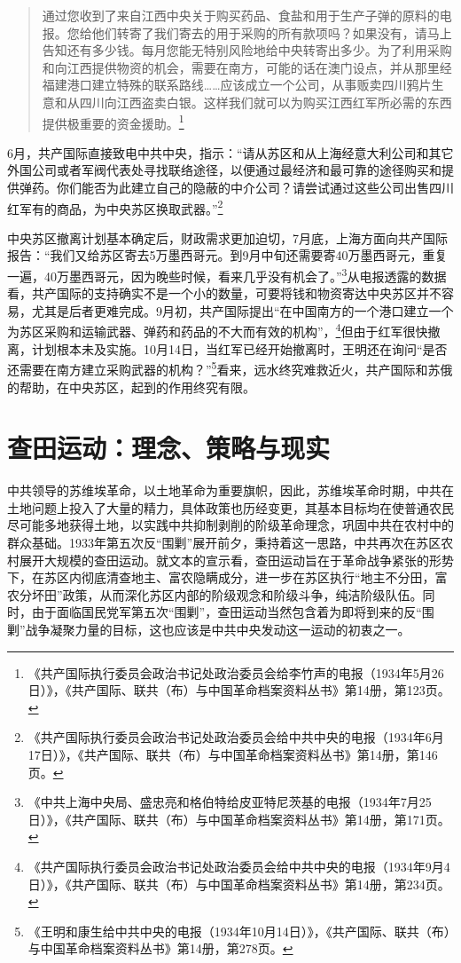 \begin{quote}

通过您收到了来自江西中央关于购买药品、食盐和用于生产子弹的原料的电报。您给他们转寄了我们寄去的用于采购的所有款项吗？如果没有，请马上告知还有多少钱。每月您能无特别风险地给中央转寄出多少。为了利用采购和向江西提供物资的机会，需要在南方，可能的话在澳门设点，并从那里经福建港口建立特殊的联系路线……应该成立一个公司，从事贩卖四川鸦片生意和从四川向江西盗卖白银。这样我们就可以为购买江西红军所必需的东西提供极重要的资金援助。\footnote{《共产国际执行委员会政治书记处政治委员会给李竹声的电报（1934年5月26日）》，《共产国际、联共（布）与中国革命档案资料丛书》第14册，第123页。}
\end{quote}


6月，共产国际直接致电中共中央，指示：“请从苏区和从上海经意大利公司和其它外国公司或者军阀代表处寻找联络途径，以便通过最经济和最可靠的途径购买和提供弹药。你们能否为此建立自己的隐蔽的中介公司？请尝试通过这些公司出售四川红军有的商品，为中央苏区换取武器。”\footnote{《共产国际执行委员会政治书记处政治委员会给中共中央的电报（1934年6月17日）》，《共产国际、联共（布）与中国革命档案资料丛书》第14册，第146页。}


中央苏区撤离计划基本确定后，财政需求更加迫切，7月底，上海方面向共产国际报告：“我们又给苏区寄去5万墨西哥元。到9月中旬还需要寄40万墨西哥元，重复一遍，40万墨西哥元，因为晚些时候，看来几乎没有机会了。”\footnote{《中共上海中央局、盛忠亮和格伯特给皮亚特尼茨基的电报（1934年7月25日）》，《共产国际、联共（布）与中国革命档案资料丛书》第14册，第171页。}从电报透露的数据看，共产国际的支持确实不是一个小的数量，可要将钱和物资寄达中央苏区并不容易，尤其是后者更难完成。9月初，共产国际提出“在中国南方的一个港口建立一个为苏区采购和运输武器、弹药和药品的不大而有效的机构”，\footnote{《共产国际执行委员会政治书记处政治委员会给中共中央的电报（1934年9月4日）》，《共产国际、联共（布）与中国革命档案资料丛书》第14册，第234页。}但由于红军很快撤离，计划根本未及实施。10月14日，当红军已经开始撤离时，王明还在询问“是否还需要在南方建立采购武器的机构？”\footnote{《王明和康生给中共中央的电报（1934年10月14日）》，《共产国际、联共（布）与中国革命档案资料丛书》第14册，第278页。}看来，远水终究难救近火，共产国际和苏俄的帮助，在中央苏区，起到的作用终究有限。

\section{查田运动：理念、策略与现实}


中共领导的苏维埃革命，以土地革命为重要旗帜，因此，苏维埃革命时期，中共在土地问题上投入了大量的精力，具体政策也历经变更，其基本目标均在使普通农民尽可能多地获得土地，以实践中共抑制剥削的阶级革命理念，巩固中共在农村中的群众基础。1933年第五次反“围剿”展开前夕，秉持着这一思路，中共再次在苏区农村展开大规模的查田运动。就文本的宣示看，查田运动旨在于革命战争紧张的形势下，在苏区内彻底清查地主、富农隐瞒成分，进一步在苏区执行“地主不分田，富农分坏田”政策，从而深化苏区内部的阶级观念和阶级斗争，纯洁阶级队伍。同时，由于面临国民党军第五次“围剿”，查田运动当然包含着为即将到来的反“围剿”战争凝聚力量的目标，这也应该是中共中央发动这一运动的初衷之一。


